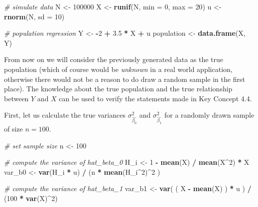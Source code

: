 \documentclass[]{book}
\newenvironment{Shaded}{\begin{snugshade}}{\end{snugshade}}
\newcommand{\KeywordTok}[1]{\textcolor[rgb]{0.13,0.29,0.53}{\textbf{#1}}}
\newcommand{\DataTypeTok}[1]{\textcolor[rgb]{0.13,0.29,0.53}{#1}}
\newcommand{\DecValTok}[1]{\textcolor[rgb]{0.00,0.00,0.81}{#1}}
\newcommand{\FloatTok}[1]{\textcolor[rgb]{0.00,0.00,0.81}{#1}}
\newcommand{\StringTok}[1]{\textcolor[rgb]{0.31,0.60,0.02}{#1}}
\newcommand{\CommentTok}[1]{\textcolor[rgb]{0.56,0.35,0.01}{\textit{#1}}}
\newcommand{\OperatorTok}[1]{\textcolor[rgb]{0.81,0.36,0.00}{\textbf{#1}}}
\newcommand{\NormalTok}[1]{#1}
\theoremstyle{definition}
\theoremstyle{definition}
\theoremstyle{definition}
\theoremstyle{remark}
\begin{document}
\begin{Shaded}
\begin{Highlighting}[]
\CommentTok{# simulate data}
\NormalTok{N <-}\StringTok{ }\DecValTok{100000}
\NormalTok{X <-}\StringTok{ }\KeywordTok{runif}\NormalTok{(N, }\DataTypeTok{min =} \DecValTok{0}\NormalTok{, }\DataTypeTok{max =} \DecValTok{20}\NormalTok{)}
\NormalTok{u <-}\StringTok{ }\KeywordTok{rnorm}\NormalTok{(N, }\DataTypeTok{sd =} \DecValTok{10}\NormalTok{)}

\CommentTok{# population regression}
\NormalTok{Y <-}\StringTok{ }\OperatorTok{-}\DecValTok{2} \OperatorTok{+}\StringTok{ }\FloatTok{3.5} \OperatorTok{*}\StringTok{ }\NormalTok{X }\OperatorTok{+}\StringTok{ }\NormalTok{u}
\NormalTok{population <-}\StringTok{ }\KeywordTok{data.frame}\NormalTok{(X, Y)}
\end{Highlighting}
\end{Shaded}

From now on we will consider the previously generated data as the true
population (which of course would be \emph{unknown} in a real world
application, otherwise there would not be a reason to do draw a random
sample in the first place). The knowledge about the true population and
the true relationship between \(Y\) and \(X\) can be used to verify the
statements made in Key Concept 4.4.

First, let us calculate the true variances \(\sigma^2_{\hat{\beta_0}}\)
and \(\sigma^2_{\hat{\beta_1}}\) for a randomly drawn sample of size
\(n = 100\).

\begin{Shaded}
\begin{Highlighting}[]
\CommentTok{# set sample size}
\NormalTok{n <-}\StringTok{ }\DecValTok{100}

\CommentTok{# compute the variance of hat_beta_0}
\NormalTok{H_i <-}\StringTok{ }\DecValTok{1} \OperatorTok{-}\StringTok{ }\KeywordTok{mean}\NormalTok{(X) }\OperatorTok{/}\StringTok{ }\KeywordTok{mean}\NormalTok{(X}\OperatorTok{^}\DecValTok{2}\NormalTok{) }\OperatorTok{*}\StringTok{ }\NormalTok{X}
\NormalTok{var_b0 <-}\StringTok{ }\KeywordTok{var}\NormalTok{(H_i }\OperatorTok{*}\StringTok{ }\NormalTok{u) }\OperatorTok{/}\StringTok{ }\NormalTok{(n }\OperatorTok{*}\StringTok{ }\KeywordTok{mean}\NormalTok{(H_i}\OperatorTok{^}\DecValTok{2}\NormalTok{)}\OperatorTok{^}\DecValTok{2}\NormalTok{ )}

\CommentTok{# compute the variance of hat_beta_1}
\NormalTok{var_b1 <-}\StringTok{ }\KeywordTok{var}\NormalTok{( ( X }\OperatorTok{-}\StringTok{ }\KeywordTok{mean}\NormalTok{(X) ) }\OperatorTok{*}\StringTok{ }\NormalTok{u ) }\OperatorTok{/}\StringTok{ }\NormalTok{(}\DecValTok{100} \OperatorTok{*}\StringTok{ }\KeywordTok{var}\NormalTok{(X)}\OperatorTok{^}\DecValTok{2}\NormalTok{)}
\end{Highlighting}
\end{Shaded}
\end{document}
